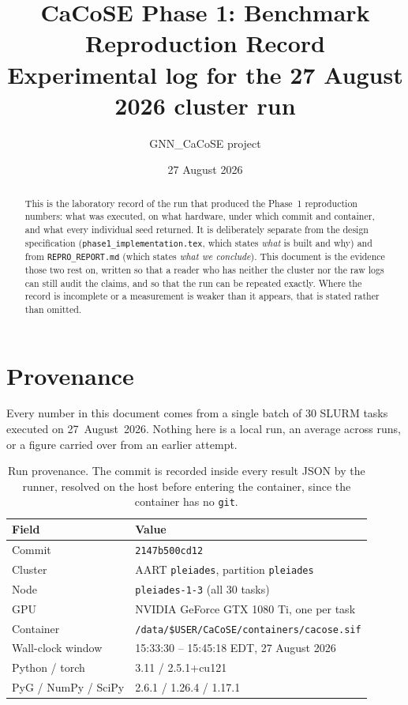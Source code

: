 \documentclass[11pt,a4paper]{article}
\title{\vspace{-2em}CaCoSE Phase 1: Benchmark Reproduction Record\\
\large Experimental log for the 27 August 2026 cluster run}
\author{GNN\_CaCoSE project}
\date{27 August 2026}
\begin{document}
\maketitle
\vspace{-1.5em}

\begin{abstract}
\noindent This is the laboratory record of the run that produced the Phase~1 reproduction
numbers: what was executed, on what hardware, under which commit and container, and what every
individual seed returned. It is deliberately separate from the design specification
(\texttt{phase1\_implementation.tex}, which states \emph{what} is built and why) and from
\texttt{REPRO\_REPORT.md} (which states \emph{what we conclude}). This document is the evidence
those two rest on, written so that a reader who has neither the cluster nor the raw logs can still
audit the claims, and so that the run can be repeated exactly. Where the record is incomplete or a
measurement is weaker than it appears, that is stated rather than omitted.
\end{abstract}

\section{Provenance}

Every number in this document comes from a single batch of 30 SLURM tasks executed on
27~August~2026. Nothing here is a local run, an average across runs, or a figure carried over from
an earlier attempt.

\begin{table}[!htbp]
\centering
\begin{tabular}{ll}
\toprule
Field & Value \\
\midrule
Commit & \texttt{2147b500cd12} \\
Cluster & AART \texttt{pleiades}, partition \texttt{pleiades} \\
Node & \texttt{pleiades-1-3} (all 30 tasks) \\
GPU & NVIDIA GeForce GTX 1080 Ti, one per task \\
Container & \texttt{/data/\$USER/CaCoSE/containers/cacose.sif} \\
Wall-clock window & 15:33:30 -- 15:45:18 EDT, 27 August 2026 \\
Python / torch & 3.11 / 2.5.1+cu121 \\
PyG / NumPy / SciPy & 2.6.1 / 1.26.4 / 1.17.1 \\
\bottomrule
\end{tabular}
\caption{Run provenance. The commit is recorded inside every result JSON by the runner, resolved on
the host before entering the container, since the container has no \texttt{git}.}
\end{table}
\end{document}
